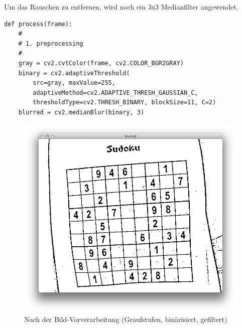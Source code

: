 Um das Rauschen zu entfernen, wird noch ein 3x3 Medianfilter angewendet.

\begin{lstlisting}
def process(frame):
    #
    # 1. preprocessing
    #
    gray = cv2.cvtColor(frame, cv2.COLOR_BGR2GRAY)
    binary = cv2.adaptiveThreshold(
        src=gray, maxValue=255,
        adaptiveMethod=cv2.ADAPTIVE_THRESH_GAUSSIAN_C,
        thresholdType=cv2.THRESH_BINARY, blockSize=11, C=2)
    blurred = cv2.medianBlur(binary, 3)
\end{lstlisting}

\begin{figure}[H]
\end{figure}
%
\begin{figure}[H]
    \centering
    \includegraphics[width=.5\textwidth]{Abbildungen/median}
    \caption{Nach der Bild-Vorverarbeitung (Graufstufen, binärisiert, gefiltert)}
\end{figure}

